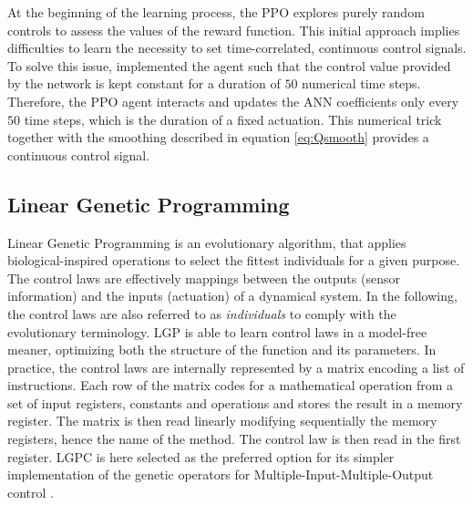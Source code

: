 At the beginning of the learning process, the PPO explores purely random controls to assess the values of the reward function. This initial approach implies difficulties to learn the necessity to set time-correlated, continuous control signals. To solve this issue, \citet{rabault2019JFM} implemented the agent such that the control value provided by the network is kept constant for a duration of $50$ numerical time steps. Therefore, the PPO agent interacts and updates the ANN coefficients only every $50$ time steps, which is the duration of a fixed actuation. This numerical trick together with the smoothing described in equation \ref{eq:Qsmooth} provides a continuous control signal. 


\subsection{Linear Genetic Programming}
Linear Genetic Programming \citep[]{Wahde2008book} is an evolutionary algorithm, that applies biological-inspired operations to select the fittest individuals for a given purpose. The control laws are effectively mappings between the outputs (sensor information) and the inputs (actuation) of a dynamical system. In the following, the control laws are also referred to as \textit{individuals} to comply with the evolutionary terminology. LGP is able to learn control laws in a model-free meaner, optimizing both the structure of the function and its parameters. In practice, the control laws are internally represented by a matrix encoding a list of instructions. Each row of the matrix codes for a mathematical operation from a set of input registers, constants and operations and stores the result in a memory register. The matrix is then read linearly modifying sequentially the memory registers, hence the name of the method. The control law is then read in the first register. LGPC is here selected as the preferred option for its simpler implementation of the genetic operators for Multiple-Input-Multiple-Output control \citep{cornejomacedaPhD}.

